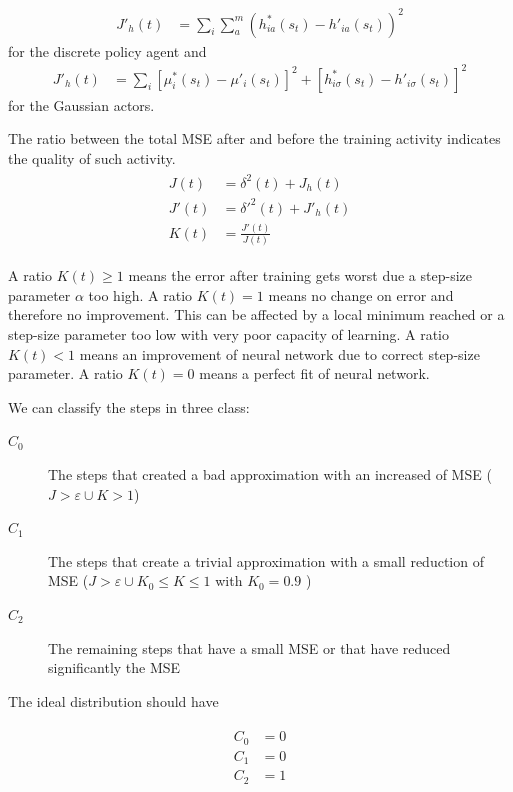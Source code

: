 \documentclass[]{article}
\begin{document}
\begin{align*}
	J'_h(t)&		= \sum_i \sum_a^m (h_{ia}^*(s_t) - h'_{ia}(s_t))^2
\end{align*}
for the discrete policy agent and
\begin{align*}
	J'_h(t)&	= \sum_i [\mu_i^*(s_t) - \mu'_i(s_t)]^2 + [h_{i\sigma}^*(s_t) - h'_{i\sigma}(s_t)]^2
\end{align*}
for the Gaussian actors.

The ratio between the total MSE after and before the training activity indicates the quality of such activity.
\begin{align}
\begin{split}
	J(t)&	= \delta^2(t) + J_h(t)
	\\
	J'(t)&	= \delta'^2(t) + J'_h(t)
	\\
	K(t)&	= \frac{J'(t)}{J(t)}
\end{split}
\end{align}

A ratio $ K(t) \ge 1 $ means the error after training gets worst due a step-size parameter $ \alpha $ too high.
A ratio $ K(t) = 1 $  means no change on error and therefore no improvement. This can be affected by a local minimum reached or a step-size parameter too low with very poor capacity of learning.
A ratio $ K(t) < 1 $ means an improvement of neural network due to correct step-size parameter.
A ratio $ K(t) = 0 $ means a perfect fit of neural network.

We can classify the steps in three class:
\begin{description}

	\item[$ C_0 $]
	The steps that created a bad approximation with an increased of MSE ($ J > \varepsilon \cup K > 1$)

	\item[$ C_1 $]
	The steps that create a trivial approximation with a small reduction of MSE ($ J > \varepsilon \cup K_0 \le K \le 1 $ with $ K_0 = 0.9$ )

	\item[$ C_2 $]
	The remaining steps that have a small MSE or that have reduced significantly the MSE
\end{description}

The ideal distribution should have 

\begin{align}
\begin{split}
	C_0 & = 0
	\\
	C_1 & = 0
	\\
	C_2 & = 1
\end{split}
\end{align}
\end{document}
